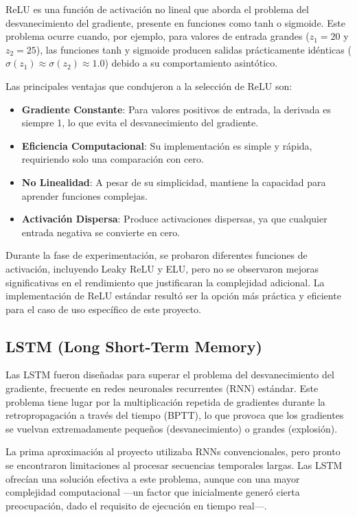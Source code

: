 ReLU es una función de activación no lineal que aborda el problema del desvanecimiento del gradiente, presente en funciones como tanh o sigmoide. Este problema ocurre cuando, por ejemplo, para valores de entrada grandes ($z_1 = 20$ y $z_2 = 25$), las funciones tanh y sigmoide producen salidas prácticamente idénticas ($\sigma(z_1) \approx \sigma(z_2) \approx 1.0$) debido a su comportamiento asintótico.

Las principales ventajas que condujeron a la selección de ReLU son:

\begin{itemize}
    \item \textbf{Gradiente Constante}: Para valores positivos de entrada, la derivada es siempre 1, lo que evita el desvanecimiento del gradiente.
    \item \textbf{Eficiencia Computacional}: Su implementación es simple y rápida, requiriendo solo una comparación con cero.
    \item \textbf{No Linealidad}: A pesar de su simplicidad, mantiene la capacidad para aprender funciones complejas.
    \item \textbf{Activación Dispersa}: Produce activaciones dispersas, ya que cualquier entrada negativa se convierte en cero.
\end{itemize}

Durante la fase de experimentación, se probaron diferentes funciones de activación, incluyendo Leaky ReLU y ELU, pero no se observaron mejoras significativas en el rendimiento que justificaran la complejidad adicional. La implementación de ReLU estándar resultó ser la opción más práctica y eficiente para el caso de uso específico de este proyecto.

\subsection{LSTM (Long Short-Term Memory)}

Las LSTM fueron diseñadas para superar el problema del desvanecimiento del gradiente, frecuente en redes neuronales recurrentes (RNN) estándar. Este problema tiene lugar por la multiplicación repetida de gradientes durante la retropropagación a través del tiempo (BPTT), lo que provoca que los gradientes se vuelvan extremadamente pequeños (desvanecimiento) o grandes (explosión).

La prima aproximación al proyecto utilizaba RNNs convencionales, pero pronto se encontraron limitaciones al procesar secuencias temporales largas. Las LSTM ofrecían una solución efectiva a este problema, aunque con una mayor complejidad computacional —un factor que inicialmente generó cierta preocupación, dado el requisito de ejecución en tiempo real—.

